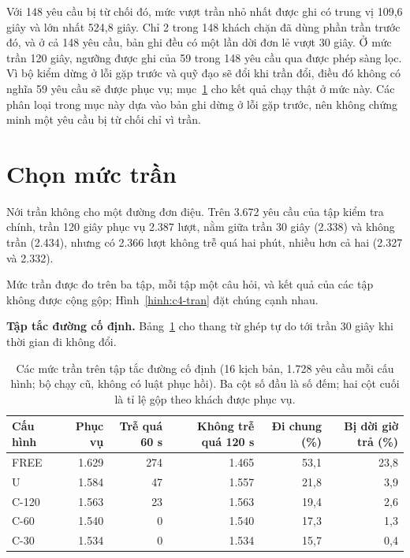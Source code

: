 Với 148 yêu cầu bị từ chối đó, mức vượt trần nhỏ nhất được ghi có trung vị 109,6 giây và lớn nhất 524,8
giây. Chỉ 2 trong 148 khách chặn đã dùng phần trần trước đó, và ở cả 148 yêu cầu, bản ghi đều có một lần
dời đơn lẻ vượt 30 giây. Ở mức trần 120 giây, ngưỡng được ghi của 59 trong 148 yêu cầu qua được phép sàng
lọc. Vì bộ kiểm dừng ở lỗi gặp trước và quỹ đạo sẽ đổi khi trần đổi, điều đó không có nghĩa 59 yêu cầu sẽ
được phục vụ; mục~\ref{muc:c4-chontran} cho kết quả chạy thật ở mức này. Các phân loại trong mục này
dựa vào bản ghi dừng ở lỗi gặp trước, nên không chứng minh một yêu cầu bị từ chối chỉ vì trần.

\section{Chọn mức trần}
\label{muc:c4-chontran}

Nới trần không cho một đường đơn điệu. Trên 3.672 yêu cầu của tập kiểm tra chính, trần 120 giây phục vụ
2.387 lượt, nằm giữa trần 30 giây (2.338) và không trần (2.434), nhưng có 2.366 lượt không trễ quá hai
phút, nhiều hơn cả hai (2.327 và 2.332).

Mức trần được đo trên ba tập, mỗi tập một câu hỏi, và kết quả của các tập không được cộng gộp;
Hình~\ref{hinh:c4-tran} đặt chúng cạnh nhau.

\textbf{Tập tắc đường cố định.} Bảng~\ref{bang:c4-codinh} cho thang từ ghép tự do tới trần 30 giây khi
thời gian đi không đổi.

\begin{table}[htbp]
\centering
\caption{Các mức trần trên tập tắc đường cố định (16 kịch bản, 1.728 yêu cầu mỗi cấu hình; bộ chạy cũ,
không có luật phục hồi). Ba cột số đầu là số đếm; hai cột cuối là tỉ lệ gộp theo khách được phục vụ.}
\label{bang:c4-codinh}
\small
\begin{tabular}{@{}lrrrrr@{}}
\toprule
\textbf{Cấu hình} & \textbf{Phục vụ} & \textbf{Trễ quá 60 s} & \textbf{Không trễ quá 120 s} &
\textbf{Đi chung (\%)} & \textbf{Bị dời giờ trả (\%)}\\
\midrule
FREE & 1.629 & 274 & 1.465 & 53,1 & 23,8\\
U & 1.584 & 47 & 1.557 & 21,8 & 3,9\\
C-120 & 1.563 & 23 & 1.563 & 19,4 & 2,6\\
C-60 & 1.540 & 0 & 1.540 & 17,3 & 1,3\\
C-30 & 1.534 & 0 & 1.534 & 15,7 & 0,4\\
\bottomrule
\end{tabular}
\end{table}

